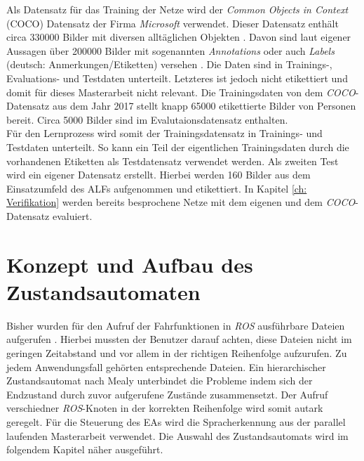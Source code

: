 		Als Datensatz für das Training der Netze wird der \textit{Common Objects in Context} (COCO) Datensatz der Firma \textit{Microsoft} verwendet. Dieser Datensatz enthält circa 330000 Bilder mit diversen alltäglichen Objekten \cite{coco, cocopaper}. Davon sind laut eigener Aussagen über 200000 Bilder mit sogenannten \textit{Annotations} oder auch \textit{Labels} (deutsch: Anmerkungen/Etiketten) versehen \cite{coco}. Die Daten sind in Trainings-, Evaluations- und Testdaten unterteilt. Letzteres ist jedoch nicht etikettiert und domit für dieses Masterarbeit nicht relevant. Die Trainingsdaten von dem \textit{COCO}-Datensatz aus dem Jahr 2017 stellt knapp 65000 etikettierte Bilder von Personen bereit. Circa 5000 Bilder sind im Evalutaionsdatensatz enthalten.\\
		
		Für den Lernprozess wird somit der Trainingsdatensatz in Trainings- und Testdaten unterteilt. So kann ein Teil der eigentlichen Trainingsdaten durch die vorhandenen Etiketten als Testdatensatz verwendet werden. Als zweiten Test wird ein eigener Datensatz erstellt. Hierbei werden 160 Bilder aus dem Einsatzumfeld des ALFs aufgenommen und etikettiert. In Kapitel \ref{ch: Verifikation} werden bereits besprochene Netze mit dem eigenen und dem \textit{COCO}-Datensatz evaluiert.
		
	\section{Konzept und Aufbau des Zustandsautomaten}
	\label{sec: Umsetzung der Statemachine}
	Bisher wurden für den Aufruf der Fahrfunktionen in \textit{ROS} ausführbare Dateien aufgerufen \cite{Bachelorarbeit}. Hierbei mussten der Benutzer darauf achten, diese Dateien nicht im geringen Zeitabstand und vor allem in der richtigen Reihenfolge aufzurufen. Zu jedem Anwendungsfall gehörten entsprechende Dateien. Ein hierarchischer Zustandsautomat nach Mealy unterbindet die Probleme indem sich der Endzustand durch zuvor aufgerufene Zustände zusammensetzt. Der Aufruf verschiedner \textit{ROS}-Knoten in der korrekten Reihenfolge wird somit autark geregelt. Für die Steuerung des EAs wird die Spracherkennung aus der parallel laufenden Masterarbeit verwendet. Die Auswahl des Zustandsautomats wird im folgendem Kapitel näher ausgeführt.\\	
	
